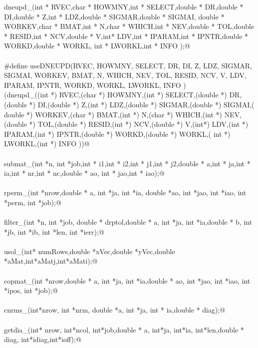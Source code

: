 \documentclass[12pt]{article}
\begin{document}
\begin{flushleft}
\begin{minipage}{\linewidth}
\begin{list}{}{}
\mbox{}\verb@void dneupd_(int * RVEC,char * HOWMNY,int * SELECT,double * DR,double * DI,double * Z,int * LDZ,double * SIGMAR,double * SIGMAI, double * WORKEV,char *  BMAT,int *  N,char * WHICH,int * NEV,double * TOL,double * RESID,int * NCV,double * V,int* LDV,int * IPARAM,int * IPNTR,double * WORKD,double * WORKL, int *  LWORKL,int * INFO );@\\
\mbox{}\verb@@\\
\mbox{}\verb@#define useDNEUPD(RVEC, HOWMNY, SELECT, DR, DI, Z, LDZ, SIGMAR, SIGMAI, WORKEV,  BMAT,  N, WHICH, NEV, TOL, RESID, NCV, V, LDV, IPARAM, IPNTR, WORKD, WORKL,  LWORKL, INFO )\@\\
\mbox{}\verb@(dneupd_((int *) RVEC,(char *) HOWMNY,(int *) SELECT,(double *) DR,(double *) DI,(double *) Z,(int *) LDZ,(double *) SIGMAR,(double *) SIGMAI,( double *) WORKEV,(char *)  BMAT,(int *)  N,(char *) WHICH,(int *) NEV,(double *) TOL,(double *) RESID,(int *) NCV,(double *) V,(int*) LDV,(int *) IPARAM,(int *) IPNTR,(double *) WORKD,(double *) WORKL,( int *)  LWORKL,(int *) INFO ))@\\
\mbox{}\verb@@\\
\mbox{}\verb@int submat_(int *n, int *job,int * i1,int * i2,int * j1,int * j2,double * a,int * ja,int * ia,int * nr,int * nc,double * ao, int *      jao,int * iao);@\\
\mbox{}\verb@@\\
\mbox{}\verb@int rperm_(int *nrow,double * a, int *ja, int *ia, double *ao, int *jao, int *iao, int *perm, int *job);@\\
\mbox{}\verb@@\\
\mbox{}\verb@int filter_(int *n, int *job, double * drptol,double * a, int *ja, int *ia,double * b, int *jb, int *ib, int *len, int *ierr);@\\
\mbox{}\verb@@\\
\mbox{}\verb@int usol_(int* numRows,double *xVec,double *yVec,double *aMat,int*aMatj,int*aMati);@\\
\mbox{}\verb@@\\
\mbox{}\verb@int copmat_(int *nrow,double * a, int *ja, int *ia,double * ao, int *jao, int *iao, int *ipos, int *job);@\\
\mbox{}\verb@@\\
\mbox{}\verb@int cnrms_(int*nrow, int *nrm, double *a, int *ja, int * ia,double * diag);@\\
\mbox{}\verb@@\\
\mbox{}\verb@int getdia_(int* nrow, int*ncol, int*job,double * a, int*ja, int*ia, int*len,double * diag, int*idiag,int*ioff);@\\

\end{list}
\end{minipage}
\end{flushleft}
\end{document}
